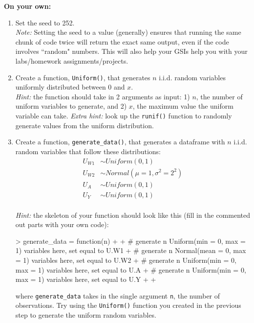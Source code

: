 \documentclass{exam}
\begin{document}
\noindent\textbf{On your own:}

\begin{enumerate}
\item Set the seed to 252. \\
\textit{Note:} Setting the seed to a value (generally) ensures that running the same chunk of code twice will return the exact same output, even if the code involves ``random" numbers. This will also help your GSIs help you with your labs/homework assignments/projects.
\item Create a function, \texttt{Uniform()}, that generates $n$ i.i.d. random variables uniformly distributed between 0 and $x$. \\
\textit{Hint:} the function should take in 2 arguments as input: 1) $n$, the number of uniform variables to generate, and 2) $x$, the maximum value the uniform variable can take. \textit{Extra hint:} look up the \texttt{runif()} function to randomly generate values from the uniform distribution.
\item Create a function, \texttt{generate\_data()}, that generates a dataframe with $n$ i.i.d. random variables that follow these distributions:\\
\begin{align*}
U_{W1}&\sim Uniform(0,1) \\
U_{W2}& \sim Normal(\mu=1, \sigma^2=2^2)\\
U_{A} &\sim Uniform(0,1)\\
U_{Y} &\sim Uniform(0,1)\\
\end{align*}

\textit{Hint:} the skeleton of your function should look like this (fill in the commented out parts with your own code):
\begin{Schunk}
\begin{Sinput}
> generate_data = function(n) {
+   
+   # generate n Uniform(min = 0, max = 1) variables here, set equal to U.W1
+   # generate n Normal(mean = 0, max = 1) variables here, set equal to U.W2
+   # generate n Uniform(min = 0, max = 1) variables here, set equal to U.A
+   # generate n Uniform(min = 0, max = 1) variables here, set equal to U.Y
+   
+ }
\end{Sinput}
\end{Schunk}

where \texttt{generate\_data} takes in the single argument \texttt{n}, the number of observations. Try using the \texttt{Uniform()} function you created in the previous step to generate the uniform random variables.


\end{enumerate}
\end{document}
